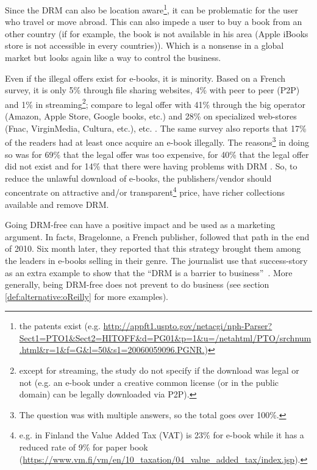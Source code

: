 \documentclass[11pt,a4paper,oneside]{memoir}
\begin{document}
Since the DRM can also be location aware\footnote{the patents exist (e.g. \url{http://appft1.uspto.gov/netacgi/nph-Parser?Sect1=PTO1&Sect2=HITOFF&d=PG01&p=1&u=/netahtml/PTO/srchnum.html&r=1&f=G&l=50&s1=20060059096.PGNR.})}, it can be problematic for the user who travel or move abroad. This can also impede a user to buy a book from an other country (if for example, the book is not available in his area (Apple iBooks store is not accessible in every countries)). Which is a nonsense in a global market but looks again like a way to control the business.

Even if the illegal offers exist for e-books, it is minority. Based on a French survey, it is only 5\% through file sharing websites, 4\% with peer to peer (P2P) and 1\% in streaming\footnote{except for streaming, the study do not specify if the download was legal or not (e.g. an e-book under a creative common license (or in the public domain) can be legally downloaded via P2P).}; compare to legal offer with 41\% through the big operator (Amazon, Apple Store, Google books, etc.) and 28\% on specialized web-stores (Fnac, VirginMedia, Cultura, etc.), etc. \cite[p. 9]{OpinionWay:baro_v2}. The same survey also reports that 17\% of the readers had at least once acquire an e-book illegally. The reasons\footnote{The question was with multiple answers, so the total goes over 100\%.} in doing so was for 69\% that the legal offer was too expensive, for 40\% that the legal offer did not exist and for 14\% that there were having problems with DRM \cite[p. 13]{OpinionWay:baro_v2}. So, to reduce the unlawful download of e-books, the publishers/vendor should concentrate on attractive and/or transparent\footnote{e.g. in Finland the Value Added Tax (VAT) is 23\% for e-book while it has a reduced rate of 9\% for paper book (\url{https://www.vm.fi/vm/en/10_taxation/04_value_added_tax/index.jsp}).} price, have richer collections available and remove DRM.

Going DRM-free can have a positive impact and be used as a marketing argument. In facts, Bragelonne, a French publisher, followed that path in the end of 2010. Six month later, they reported that this strategy brought them among the leaders in e-books selling in their genre. The journalist use that success-story as an extra example to show that the \textquotedblleft DRM is a barrier to business\textquotedblright ~\cite{numerama:drm}. More generally, being DRM-free does not prevent to do business (see section \vref{def:alternative:oReilly} for more examples).
\end{document}
